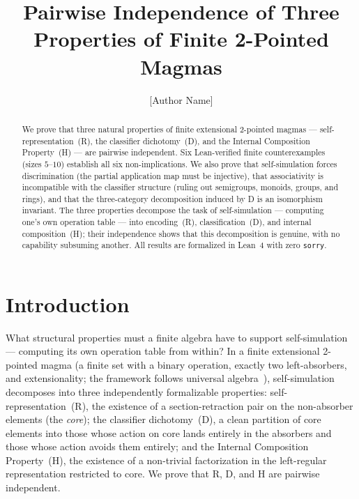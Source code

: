 \documentclass[a4paper,UKenglish,cleveref,autoref,thm-restate]{lipics-v2021}
\title{Pairwise Independence of Three Properties of Finite 2-Pointed Magmas}
\author{[Author Name]}{[Affiliation], [Country]}{[email]}{}{[funding if any]}
\begin{document}
\maketitle

\begin{abstract}
We prove that three natural properties of finite extensional 2-pointed magmas --- self-representation~(R), the classifier dichotomy~(D), and the Internal Composition Property~(H) --- are pairwise independent. Six Lean-verified finite counterexamples (sizes $5$--$10$) establish all six non-implications. We also prove that self-simulation forces discrimination (the partial application map must be injective), that associativity is incompatible with the classifier structure (ruling out semigroups, monoids, groups, and rings), and that the three-category decomposition induced by D is an isomorphism invariant. The three properties decompose the task of self-simulation --- computing one's own operation table --- into encoding~(R), classification~(D), and internal composition~(H); their independence shows that this decomposition is genuine, with no capability subsuming another. All results are formalized in Lean~4 with zero \texttt{sorry}.
\end{abstract}

\section{Introduction}
\label{sec:introduction}

What structural properties must a finite algebra have to support self-simulation --- computing its own operation table from within? In a finite extensional 2-pointed magma (a finite set with a binary operation, exactly two left-absorbers, and extensionality; the framework follows universal algebra~\cite{burris81}), self-simulation decomposes into three independently formalizable properties: self-representation~(R), the existence of a section-retraction pair on the non-absorber elements (the \emph{core}); the classifier dichotomy~(D), a clean partition of core elements into those whose action on core lands entirely in the absorbers and those whose action avoids them entirely; and the Internal Composition Property~(H), the existence of a non-trivial factorization in the left-regular representation restricted to core. We prove that R, D, and H are pairwise independent.
\end{document}
